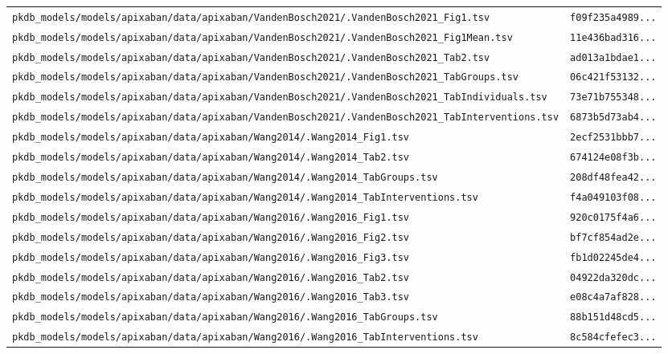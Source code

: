 \documentclass{article}
\begin{document}
\begin{longtable}{ll}
\texttt{pkdb\_models/models/apixaban/data/apixaban/VandenBosch2021/.VandenBosch2021\_Fig1.tsv} & \texttt{f09f235a4989...} \\
\texttt{pkdb\_models/models/apixaban/data/apixaban/VandenBosch2021/.VandenBosch2021\_Fig1Mean.tsv} & \texttt{11e436bad316...} \\
\texttt{pkdb\_models/models/apixaban/data/apixaban/VandenBosch2021/.VandenBosch2021\_Tab2.tsv} & \texttt{ad013a1bdae1...} \\
\texttt{pkdb\_models/models/apixaban/data/apixaban/VandenBosch2021/.VandenBosch2021\_TabGroups.tsv} & \texttt{06c421f53132...} \\
\texttt{pkdb\_models/models/apixaban/data/apixaban/VandenBosch2021/.VandenBosch2021\_TabIndividuals.tsv} & \texttt{73e71b755348...} \\
\texttt{pkdb\_models/models/apixaban/data/apixaban/VandenBosch2021/.VandenBosch2021\_TabInterventions.tsv} & \texttt{6873b5d73ab4...} \\
\texttt{pkdb\_models/models/apixaban/data/apixaban/Wang2014/.Wang2014\_Fig1.tsv} & \texttt{2ecf2531bbb7...} \\
\texttt{pkdb\_models/models/apixaban/data/apixaban/Wang2014/.Wang2014\_Tab2.tsv} & \texttt{674124e08f3b...} \\
\texttt{pkdb\_models/models/apixaban/data/apixaban/Wang2014/.Wang2014\_TabGroups.tsv} & \texttt{208df48fea42...} \\
\texttt{pkdb\_models/models/apixaban/data/apixaban/Wang2014/.Wang2014\_TabInterventions.tsv} & \texttt{f4a049103f08...} \\
\texttt{pkdb\_models/models/apixaban/data/apixaban/Wang2016/.Wang2016\_Fig1.tsv} & \texttt{920c0175f4a6...} \\
\texttt{pkdb\_models/models/apixaban/data/apixaban/Wang2016/.Wang2016\_Fig2.tsv} & \texttt{bf7cf854ad2e...} \\
\texttt{pkdb\_models/models/apixaban/data/apixaban/Wang2016/.Wang2016\_Fig3.tsv} & \texttt{fb1d02245de4...} \\
\texttt{pkdb\_models/models/apixaban/data/apixaban/Wang2016/.Wang2016\_Tab2.tsv} & \texttt{04922da320dc...} \\
\texttt{pkdb\_models/models/apixaban/data/apixaban/Wang2016/.Wang2016\_Tab3.tsv} & \texttt{e08c4a7af828...} \\
\texttt{pkdb\_models/models/apixaban/data/apixaban/Wang2016/.Wang2016\_TabGroups.tsv} & \texttt{88b151d48cd5...} \\
\texttt{pkdb\_models/models/apixaban/data/apixaban/Wang2016/.Wang2016\_TabInterventions.tsv} & \texttt{8c584cfefec3...} \\

\end{longtable}
\end{document}
